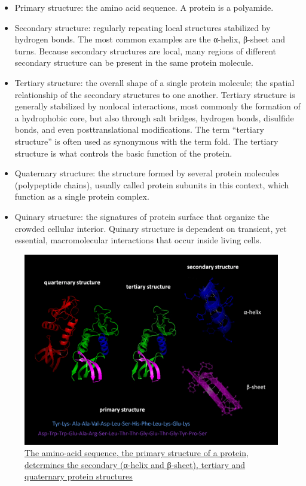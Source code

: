 \begin{itemize}
\tightlist
\item
  Primary structure: the amino acid sequence. A protein is a polyamide.
\item
  Secondary structure: regularly repeating local structures stabilized by hydrogen bonds. The most common examples are the α-helix, β-sheet and turns. Because secondary structures are local, many regions of different secondary structure can be present in the same protein molecule.
\item
  Tertiary structure: the overall shape of a single protein molecule; the spatial relationship of the secondary structures to one another. Tertiary structure is generally stabilized by nonlocal interactions, most commonly the formation of a hydrophobic core, but also through salt bridges, hydrogen bonds, disulfide bonds, and even posttranslational modifications. The term ``tertiary structure'' is often used as synonymous with the term fold. The tertiary structure is what controls the basic function of the protein.
\item
  Quaternary structure: the structure formed by several protein molecules (polypeptide chains), usually called protein subunits in this context, which function as a single protein complex.
\item
  Quinary structure: the signatures of protein surface that organize the crowded cellular interior. Quinary structure is dependent on transient, yet essential, macromolecular interactions that occur inside living cells.
\end{itemize}



\begin{figure}

{\centering \includegraphics[width=0.7\linewidth]{./figures/chemistry/Protein_structure} 

}

\caption{\href{(https://commons.wikimedia.org/wiki/File:Protein_structure.png)}{The amino-acid sequence, the primary structure of a protein, determines the secondary (α-helix and β-sheet), tertiary and quaternary protein structures}}\label{fig:proteinstructure}
\end{figure}

